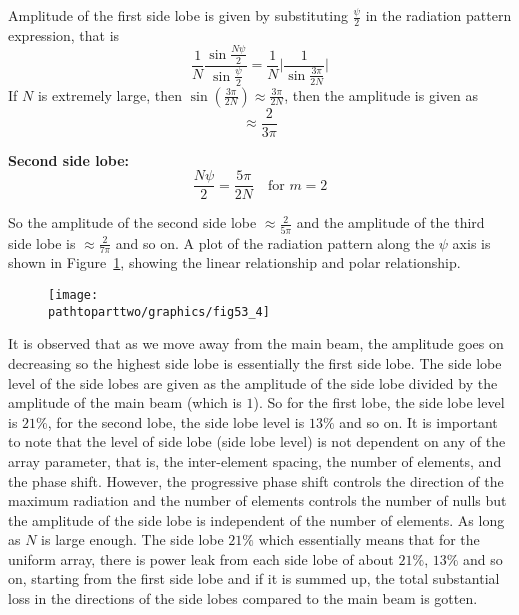 Amplitude of the first side lobe is given by substituting $\frac{\psi}{2}$ in the radiation pattern expression, that is
$$\frac{1}{N} \frac{\sin{\frac{N\psi}{2}}}{\sin{\frac{\psi}{2}}} = \frac{1}{N} |{\frac{1}{\sin{\frac{3\pi}{2N}}} |}   $$
If $N$ is extremely large, then $\sin{(\frac{3\pi}{2N})} \approx  \frac{3\pi}{2N}$, then the amplitude is given as $$\approx \frac{2}{3\pi}$$


\textbf{Second side lobe:}
$$\frac{N\psi}{2} = \frac{5\pi}{2N} \quad \text{for $m=2$} $$

So the amplitude of the second side lobe  $\approx \frac{2}{5\pi}$ and the amplitude of the third side lobe is $\approx \frac{2}{7\pi}$ and so on. A plot of the radiation pattern along the $\psi$ axis is shown in Figure~\ref{53.4}, showing the linear relationship and polar relationship.
\begin{figure}[h]
\centering
\texttt{[image: \\pathtoparttwo/graphics/fig53\_4]}
\caption{}
\label{53.4}
\end{figure}

It is observed that as we move away from the main beam,  the amplitude goes on decreasing so the highest side lobe is essentially the first side lobe. The side lobe level of the side lobes are given as the amplitude of the side lobe divided by the amplitude of the main beam (which is $1$). So for the first lobe, the side lobe level is $21\%$, for the second lobe, the side lobe level is $13\%$ and so on. It is important to note that the level of side lobe (side lobe level) is not dependent on any of the array parameter, that is, the inter-element spacing, the number of elements, and the phase shift. However, the progressive phase shift controls the direction of the maximum radiation and the number of elements controls the number of nulls but the amplitude of the side lobe is independent of the number of elements. As long as $N$ is large enough. The side lobe $21\%$ which essentially means that for the uniform array, there is power leak  from each side lobe of about $21\%$, $13\%$ and so on, starting from the first side lobe and if it is summed up, the total substantial loss in the directions of the side lobes compared to the main beam is gotten.